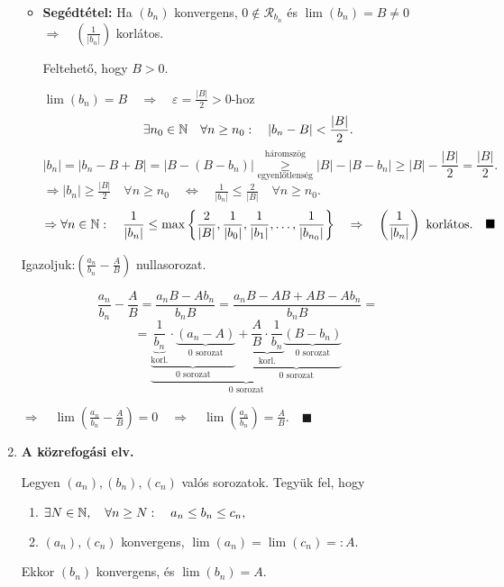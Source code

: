 \documentclass[a4paper,11.5pt]{article}
\begin{document}
\begin{enumerate}
		\biz
		
		\begin{itemize}[~~~~~~~~]
			\item \textbf{Segédtétel:} Ha $(b_n)$ konvergens, $0\not\in\mathcal{R}_{b_n}$ és $\lim(b_n)=B\not=0$\quad $\Rightarrow\displaystyle\quad \left(\frac{1}{|b_n|}\right)$ korlátos.
			
			\biz Feltehető, hogy $B>0$.
			
			$\lim(b_n)=B\quad \Rightarrow\quad \varepsilon=\displaystyle\frac{|B|}{2}>0\text{-hoz }$
			\[ \exists n_0\in\mathbb{N}\quad \forall n\geq n_0:\quad |b_n-B|<\frac{|B|}{2}.\]
			\[ |b_n|=|b_n-B+B|=|B-(B-b_n)|\overset{\text{háromszög}}{\underset{\text{egyenlőtlenség}}{\geq}} |B|-|B-b_n|\geq |B|-\frac{|B|}{2}=\frac{|B|}{2}. \]
			$\Rightarrow |b_n|\geq \displaystyle\frac{|B|}{2}\quad \forall n\geq n_0 \quad \Leftrightarrow \quad \frac{1}{|b_n|}\leq \frac{2}{|B|}\quad \forall n\geq n_0.$
			\[ \Rightarrow \forall n\in\mathbb{N}:\quad \frac{1}{|b_n|}\leq \max\left\{ \frac{2}{|B|},\frac{1}{|b_0|},\frac{1}{|b_1|},\ldots,\frac{1}{|b_{n_0}|} \right\}\quad \Rightarrow\quad \left(\frac{1}{|b_n|}\right)\text{ korlátos.}\quad \blacksquare \]
		\end{itemize}
		Igazoljuk:\quad $\displaystyle\left(\frac{a_n}{b_n}-\frac{A}{B}\right)$ nullasorozat.
		
		\[ \frac{a_n}{b_n}-\frac{A}{B}=\frac{a_nB-Ab_n}{b_nB}=\frac{a_nB-AB+AB-Ab_n}{b_nB}=\]
		\[=\underbrace{\underbrace{\underbrace{\frac{1}{b_n}}_{\text{korl.}}\cdot\underbrace{\left(a_n-A\right)}_{\text{0 sorozat}}}_{\text{0 sorozat}}+\underbrace{\underbrace{\frac{A}{B}\cdot\frac{1}{b_n}}_{\text{korl.}}\underbrace{(B-b_n)}_{\text{0 sorozat}}}_{\text{0 sorozat}}}_{\text{0 sorozat}} \]
		
		$\Rightarrow \quad \lim\left(\displaystyle\frac{a_n}{b_n}-\displaystyle\frac{A}{B}\right)=0\quad \Rightarrow\quad \lim\left(\displaystyle\frac{a_n}{b_n}\right)=\displaystyle\frac{A}{B}.\quad \blacksquare$
		
		\item \textbf{A közrefogási elv.}
		
		Legyen $(a_n), (b_n), (c_n)$ valós sorozatok. Tegyük fel, hogy
		\begin{enumerate}
			\item $\exists N\in\mathbb{N},\quad \forall n\geq N:\quad a_n\leq b_n\leq c_n,$
			\item $(a_n), (c_n)$ konvergens, $\lim(a_n)=\lim(c_n)=:A.$
		\end{enumerate}
		Ekkor $(b_n)$ konvergens, és $\lim(b_n)=A$.
		

\end{enumerate}
\end{document}
